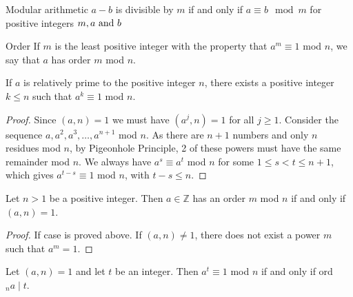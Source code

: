 
\begin{mysubsection}{}
    \begin{definition}[def:]{Modular arithmetic}
        $a-b$ is divisible by $m$ if and only if $a\equiv b \mod m$ \qquad for positive integers $m, a \textnormal{ and }b$
    \end{definition}

    \begin{definition}[def:]{Order}
        If $m$ is the least positive integer with the property that $a^m\equiv 1$ mod $n$, we say that $a$ has order $m$ mod $n$.
    \end{definition}

    \myframebreak

    \begin{theorem}[thm:]{}
        If $a$ is relatively prime to the positive integer $n$, there exists a positive integer $k\leq n$ such that $a^{k}\equiv 1$ mod $n$.
    \end{theorem}

    \begin{proof}
        Since $(a,n)=1$ we must have $(a^{j},n)=1$ for all $j\geq 1$. Consider the sequence $a,a^2,a^3,\dots,a^{n+1}$ mod $n$. As there are $n+1$ numbers and only $n$ residues mod $n$, by Pigeonhole Principle, 2 of these powers must have the same remainder mod $n$. We always have $a^s\equiv a^t$ mod $n$ for some $1\leq s<t\leq n+1$, which gives $a^{t-s}\equiv 1$ mod $n$, with $t-s\leq n$.
    \end{proof}

    \begin{theorem}[thm:]{}
        Let $n>1$ be a positive integer. Then $a\in \mathbb{Z} $ has an order $m$ mod $n$ if and only if $(a,n)=1$.
    \end{theorem}

    \begin{proof}
        If case is proved above. If $(a,n)\neq 1$, there does not exist a power $m$ such that $a^m=1$.
    \end{proof}

    \begin{theorem}[thm:]{}
        Let $(a,n)=1$ and let $t$ be an integer. Then $a^t\equiv 1$ mod $n$ if and only if ord$_n a\mid t$.
    \end{theorem}


\end{mysubsection}
